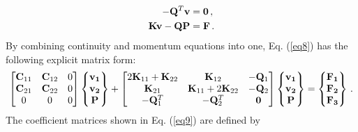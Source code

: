 \documentclass[]{article}
\begin{document}
\begin{equation}\label{eq15}
	\begin{aligned}
		-\mathbf{Q}^T \mathbf{v} &= \mathbf{0}\thinspace,\\
		\mathbf{K}\mathbf{v} - \mathbf{Q} \mathbf{P}  &= \mathbf{F}\thinspace.
	\end{aligned}
\end{equation}
By combining continuity and  momentum equations into one, Eq. (\ref{eq8}) has the following explicit matrix form:
\begin{equation}\label{eq16}
	\begin{aligned}
		\begin{bmatrix}
			\mathbf{C}_{11} & \mathbf{C}_{12} & 0 \\
			\mathbf{C}_{21} & \mathbf{C}_{22} &  0\\
			 0& 0  & 0 \\
		\end{bmatrix}
		\begin{Bmatrix}
			\mathbf{v_1} \\
			\mathbf{v_2}\\
			\mathbf{P}\\
		\end{Bmatrix}
		+\begin{bmatrix}
			2\mathbf{K}_{11} + \mathbf{K}_{22} & \mathbf{K}_{12} & -\mathbf{Q}_{1} \\
			\mathbf{K}_{21} & \mathbf{K}_{11} +2\mathbf{K}_{22} & -\mathbf{Q}_{2} \\
			-\mathbf{Q}^T_{1} & -\mathbf{Q}^T_{2}  & \mathbf{0} \\
		\end{bmatrix}
		\begin{Bmatrix}
			\mathbf{v_1} \\
			\mathbf{v_2}\\
			\mathbf{P}\\
		\end{Bmatrix}
			=\begin{Bmatrix}
				\mathbf{F_1} \\
				\mathbf{F_2}\\
				\mathbf{F_3}\\
			\end{Bmatrix}\thinspace.
	\end{aligned}
\end{equation}
The coefficient matrices shown in Eq. (\ref{eq9}) are defined by
\end{document}
